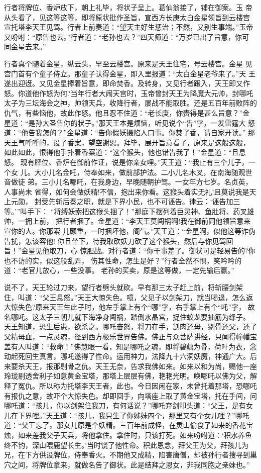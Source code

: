 行者将牌位、香炉放下，朝上礼毕，将状子呈上。葛仙翁接了，铺在御案。玉
帝从头看了，见这等这等，即将原状批作圣旨，宣西方长庚太白金星领旨到云楼宫
宣托塔李天王见驾。行者上前奏道：“望天主好生惩治；不然，又别生事端。”玉帝
又吩咐：“原告也去。”行者道：“老孙也去？”四天师道：“万岁已出了旨意，你可
同金星去来。”

行者真个随着金星，纵云头，早至云楼宫。原来是天王住宅，号云楼宫。金星
见宫门首有个童子侍立。那童子认得金星，即入里报道：“太白金星老爷来了。”天
王遂出迎迓。又见金星捧着旨意，即命焚香。及转身，又见行者跟入，天王即又作
怒。你道他作怒为何?当年行者大闹天宫时，玉帝曾封天王为降魔大元帅，封哪吒
太子为三坛海会之神，帅领天兵，收降行者，屡战不能取胜。还是五百年前败阵的
仇气，有些恼他，故此作怒。他且忍不住道：“老长庚，你赍得是甚么旨意？”金
星道：“是孙大圣告你的状子。”那天王本是烦恼，听见说个“告”字，一发雷霆大
怒道：“他告我怎的？”金星道：“告你假妖摄陷人口事。你焚了香，请自家开读。”
那天王气呼呼的，设了香案，望空谢恩。拜毕，展开旨意看了，原来是这般这般，
如此如此，恨得他手扑着香案道：“这个猴头，他也错告我了！”金星道：“且息怒。
现有牌位、香炉在御前作证，说是你亲女哩。”天王道：“我止有三个儿子，一个女
儿。大小儿名金吒，侍奉如来，做前部护法。二小儿名木叉，在南海随观世音做徒
弟。三小儿名哪吒，在我身边，早晚随朝护驾。一女年方七岁。名贞英，人事尚未
省得，如何会做妖精!不信，抱出来你看。这猴头着实无礼!且莫说我是天上元勋，
封受先斩后奏之职，就是下界小民，也不可诬告。律云：‘诬告加三等。’”叫手下：
“将缚妖索把这猴头捆了！”那庭下摆列着巨灵神、鱼肚将、药叉雄帅，一拥上前，
把行者捆了。金星道：“李天王莫闯祸啊!我在御前同他领旨意来宣你的人。你那索
儿颇重，一时捆坏他，阁气。”天王道：“金星啊，似他这等诈伪告扰，怎该容他!
你且坐下，待我取砍妖刀砍了这个猴头，然后与你见驾回旨！”金星见他取刀，心
惊胆战。对行者道：“你干事差了。御状可是轻易告的?你也不访的实，似这般乱弄，
伤其性命，怎生是好？”行者全然不惧，笑吟吟的道：“老官儿放心，一些没事。
老孙的买卖，原是这等做，一定先输后赢。”

说不了，天王轮过刀来，望行者劈头就砍。早有那三太子赶上前，将斩腰剑架
住，叫道：“父王息怒。”天王大惊失色。噫，父见子以剑架刀，就当喝退，怎么返
大惊失色?原来天王生此子时，他左手掌上有个“哪”字，右手掌上有个“吒”字，
故名哪吒。这太子三朝儿就下海净身闯祸，踏倒水晶宫，捉住蛟龙要抽筋为绦子。
天王知道，恐生后患，欲杀之。哪吒奋怒，将刀在手，割肉还母，剔骨还父，还了
父精母血，一点灵魂，径到西方极乐世界告佛。佛正与众菩萨讲经，只闻得幢幡宝
盖有人叫道：“救命！”佛慧眼一看，知是哪吒之魂，即将碧藕为骨，荷叶为衣，念
动起死回生真言，哪吒遂得了性命。运用神力，法降九十六洞妖魔，神通广大。后
来要杀天王，报那剔骨之仇。天王无奈，告求我佛如来。如来以和为尚，赐他一座
玲珑剔透舍利子如意黄金宝塔，那塔上层层有佛，艳艳光明。唤哪吒以佛为父，解
释了冤仇。所以称为托塔李天王者，此也。今日因闲在家，未曾托着那塔，恐哪吒
有报仇之意，故吓个大惊失色。却即回手，向塔座上取了黄金宝塔，托在手间，问
哪吒道：“孩儿，你以剑架住我刀，有何话说？”哪吒弃剑叩头道：“父王，是有女
儿在下界哩。”天王道：“孩儿，我只生了你姊妹四个，那里又有个女儿哩？”哪吒
道：“父王忘了。那女儿原是个妖精。三百年前成怪，在灵山偷食了如来的香花宝
烛，如来差我父子天兵，将他拿住。拿住时，只该打死。如来吩咐道：‘积水养鱼
终不钓，深山喂鹿望长生。’当时饶了他性命。积此恩念，拜父王为父，拜孩儿为
兄，在下方供设牌位，侍奉香火。不期他又成精，陷害唐僧，却被孙行者搜寻到巢
穴之间，将牌位拿来，就做名告了御状。此是结拜之恩女，非我同胞之亲妹也。”

